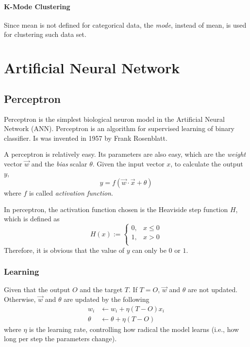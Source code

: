 \documentclass{note}
\begin{document}
\subsubsection{K-Mode Clustering}

Since mean is not defined for categorical data, the \textit{mode}, instead of mean, is used for clustering such data set.

\chapter{Artificial Neural Network}

\section{Perceptron}

Perceptron is the simplest biological neuron model in the Artificial Neural Network (ANN). Perceptron is an algorithm for supervised learning of binary classifier. Is was invented in 1957 by Frank Rosenblatt.

A perceptron is relatively easy. Its parameters are also easy, which are the \textit{weight} vector $\vec{w}$ and the \textit{bias} scalar $\theta$. Given the input vector $x$, to calculate the output $y$, 
$$
y = f(\vec{w} \cdot \vec{x} + \theta)
$$
where $f$ is called \textit{activation function}.

In perceptron, the activation function chosen is the Heaviside step function $H$, which is defined as
$$
H(x) := 
\begin{cases} 
0 , &x \leq 0  \\
1 , &x > 0 \\
\end{cases}
$$
Therefore, it is obvious that the value of $y$ can only be $0$ or $1$.

\subsection{Learning}

Given that the output $O$ and the target $T$. If $T=O$, $\vec{w}$ and $\theta$ are not updated. Otherwise, $\vec{w}$ and $\theta$ are updated by the following
\begin{align*}    
w_i &\leftarrow w_i + \eta(T - O)x_i \\
\theta &\leftarrow \theta + \eta(T - O)
\end{align*}
where $\eta$ is the learning rate, controlling how radical the model learns (i.e., how long per step the parameters change). 
\end{document}
